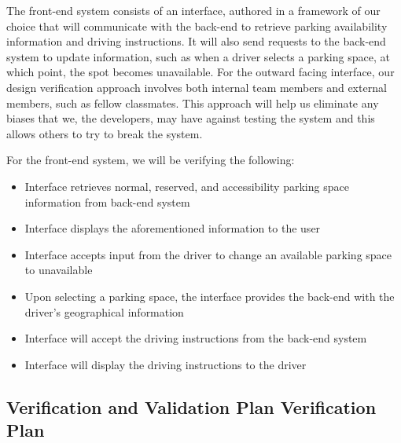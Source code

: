 \documentclass[12pt, titlepage]{article}
\begin{document}
The front-end system consists of an interface, authored in a framework of our
choice that will communicate with the back-end to retrieve parking availability
information and driving instructions. It will also send requests to the back-end
system to update information, such as when a driver selects a parking space, at
which point, the spot becomes unavailable. For the outward facing interface, our
design verification approach involves both internal team members and external
members, such as fellow classmates. This approach will help us eliminate any
biases that we, the developers, may have against testing the system and this
allows others to try to break the system.

For the front-end system, we will be verifying the following:
\begin{itemize}
    \item Interface retrieves normal, reserved, and accessibility parking space
    information from back-end system
    \item Interface displays the aforementioned information to the user
    \item Interface accepts input from the driver to change an available parking
    space to unavailable
    \item Upon selecting a parking space, the interface provides the back-end
    with the driver's geographical information
    \item Interface will accept the driving instructions from the back-end
    system
    \item Interface will display the driving instructions to the driver
\end{itemize}

\subsection{Verification and Validation Plan Verification Plan}
\label{sec:vnv}



\end{document}

